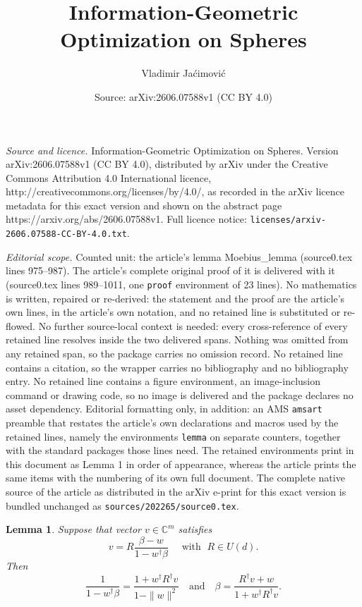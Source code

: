 \documentclass[10pt,a4paper]{amsart}
\title{Information-Geometric Optimization on Spheres}
\author{Vladimir Ja\' cimovi\'c}
\date{Source: arXiv:2606.07588v1 (CC BY 4.0)}
\newtheorem{lemma}{Lemma}
\begin{document}
\maketitle

\noindent\emph{Source and licence.} Information-Geometric Optimization on Spheres. Version arXiv:2606.07588v1 (CC BY 4.0), distributed by arXiv under the Creative Commons Attribution 4.0 International licence, http://creativecommons.org/licenses/by/4.0/, as recorded in the arXiv licence metadata for this exact version and shown on the abstract page https://arxiv.org/abs/2606.07588v1. Full licence notice: \texttt{licenses/arxiv-2606.07588-CC-BY-4.0.txt}.\par\smallskip

\noindent\textit{Editorial scope.} Counted unit: the article's lemma Moebius\_lemma (source0.tex lines 975--987). The article's complete original proof of it is delivered with it (source0.tex lines 989--1011, one \texttt{proof} environment of 23 lines). No mathematics is written, repaired or re-derived: the statement and the proof are the article's own lines, in the article's own notation, and no retained line is substituted or re-flowed.  No further source-local context is needed: every cross-reference of every retained line resolves inside the two delivered spans.  Nothing was omitted from any retained span, so the package carries no omission record.  No retained line contains a citation, so the wrapper carries no bibliography and no bibliography entry.  No retained line contains a figure environment, an image-inclusion command or drawing code, so no image is delivered and the package declares no asset dependency.  Editorial formatting only, in addition: an AMS \texttt{amsart} preamble that restates the article's own declarations and macros used by the retained lines, namely the environments \texttt{lemma} on separate counters, together with the standard packages those lines need.  The retained environments print in this document as Lemma 1 in order of appearance, whereas the article prints the same items with the numbering of its own full document.  The complete native source of the article as distributed in the arXiv e-print for this exact version is bundled unchanged as \texttt{sources/202265/source0.tex}.
\begin{lemma}
Suppose that vector $v \in {\mathbb C}^m$ satisfies
\begin{equation}
\label{Moebius_lemma}
v = R \frac{\beta - w}{1 - w^\dagger \beta} \quad \mbox{  with } \; R \in U(d).
\end{equation}
Then
\begin{equation}
\label{identity1}
\frac{1}{1 - w^\dagger \beta} = \frac{1 + w^\dagger R^\dagger v}{1 - \| w\|^2} \quad \mbox{and} \quad 
\beta = \frac{R^\dagger v + w}{1 + w^\dagger R^\dagger v}.
\end{equation}
\end{lemma}
\end{document}

